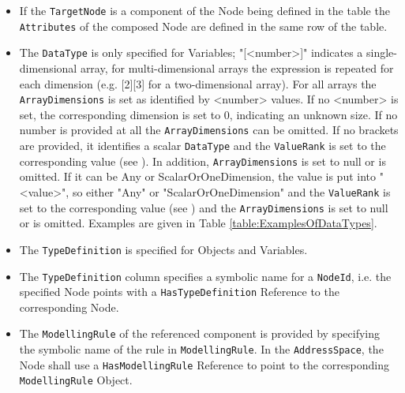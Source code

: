 \begin{itemize}
    \item If the \texttt{TargetNode} is a component of the Node being defined in the table the \texttt{Attributes} of the composed Node are defined in the same row of the table. 
    \item The \texttt{DataType} is only specified for Variables; "[<number>]" indicates a single-dimensional array, for multi-dimensional arrays the expression is repeated for each dimension (e.g. [2][3] for a two-dimensional array). For all arrays the \texttt{ArrayDimensions} is set as identified by <number> values. If no <number> is set, the corresponding dimension is set to 0, indicating an unknown size. If no number is provided at all the \texttt{ArrayDimensions} can be omitted. If no brackets are provided, it identifies a scalar \texttt{DataType} and the \texttt{ValueRank} is set to the corresponding value (see \cite{UAPart3}). In addition, \texttt{ArrayDimensions} is set to null or is omitted. If it can be Any or ScalarOrOneDimension, the value is put into "{<value>}", so either "{Any}" or "{ScalarOrOneDimension}" and the \texttt{ValueRank} is set to the corresponding value (see \cite{UAPart3}) and the \texttt{ArrayDimensions} is set to null or is omitted. Examples are given in Table \ref{table:ExamplesOfDataTypes}.
    \item The \texttt{TypeDefinition} is specified for Objects and Variables.
    \item The \texttt{TypeDefinition} column specifies a symbolic name for a \texttt{NodeId}, i.e. the specified Node points with a \texttt{HasTypeDefinition} Reference to the corresponding Node.
    \item The \texttt{ModellingRule} of the referenced component is provided by specifying the symbolic name of the rule in \texttt{ModellingRule}. In the \texttt{AddressSpace}, the Node shall use a \texttt{HasModellingRule} Reference to point to the corresponding \texttt{ModellingRule} Object.
\end{itemize}

